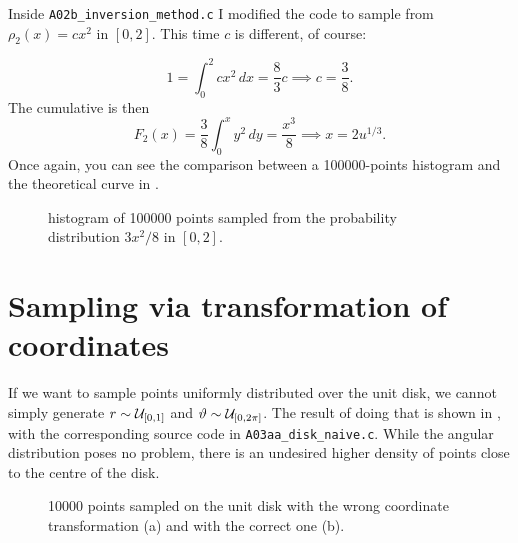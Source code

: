 Inside \texttt{A02b\_inversion\_method.c} I modified the code to sample from
$\rho_2(x) = cx^2$ in $[0, 2]$. This time $c$ is different, of course:

\begin{equation}
    1 = \int_{0}^{2} cx^2 \, dx = \frac{8}{3}c \implies c = \frac{3}{8}.
\end{equation}
The cumulative is then
\begin{equation}
    F_2(x) = \frac{3}{8} \int_{0}^{x} y^2 \, dy = \frac{x^3}{8} \implies x = 2
    u^{1/3}.
\end{equation}
Once again, you can see the comparison between a \num{100000}-points histogram
and the theoretical curve in .

\begin{figure}
    \centering
    
    \caption{histogram of \num{100000} points sampled from the probability
        distribution $3x^2/8$ in $[0, 2]$.}
    \label{fig:A02b}
\end{figure}

\section{Sampling via transformation of coordinates}
If we want to sample points uniformly distributed over the unit disk, we cannot
simply generate $r \sim \mathcal{U}_{[0, 1]}$ and $\vartheta \sim \mathcal{U}_{[0, 2\pi]}$. The
result of doing that is shown in , with the corresponding
source code in \texttt{A03aa\_disk\_naive.c}. While the angular distribution
poses no problem, there is an undesired higher density of points close to the
centre of the disk.

\begin{figure}
    \centering
    \begin{minipage}[t]{0.5\linewidth}
        \centering
        
        \subcaption{}
        \label{subfig:A03aa}
    \end{minipage}\hfill%
    \begin{minipage}[t]{0.5\linewidth} 
        \centering
            
        \subcaption{}
        \label{subfig:A03ab}
    \end{minipage}
    \caption{\num{10000} points sampled on the unit disk with the wrong
        coordinate transformation (a) and with the correct one (b).}
    \label{fig:A03a}
\end{figure}

